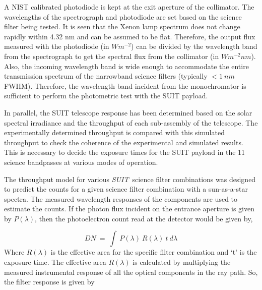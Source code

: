\documentclass[12pt]{spieman}  %
\newcommand{\suit}{{\it SUIT~}}
\begin{document}
	A NIST calibrated photodiode is kept at the exit aperture of the collimator. The wavelengths of the spectrograph and photodiode are set based on the science filter being tested. It is seen that the Xenon lamp spectrum does not change rapidly within 4.32 nm and can be assumed to be flat. Therefore, the output flux measured with the photodiode (in $Wm^{-2}$) can be divided by the wavelength band from the spectrograph to get the spectral flux from the collimator (in $W m^{-2} nm$). Also, the incoming wavelength band is wide enough to accommodate the entire transmission spectrum of the narrowband science filters (typically $< 1~nm$ FWHM). Therefore, the wavelength band incident from the monochromator is sufficient to perform the photometric test with the SUIT payload.
		
	In parallel, the SUIT telescope response has been determined based on the solar spectral irradiance and the throughput of each sub-assembly of the telescope. The experimentally determined throughput is compared with this simulated throughput to check the coherence of the experimental and simulated results. This is necessary to decide the exposure times for the SUIT payload in the 11 science bandpasses at various modes of operation.

 The throughput model for various \suit science filter combinations was designed to predict the counts for a given science filter combination with a sun-as-a-star spectra. The measured wavelength responses of the components are used to estimate the counts. If the photon flux incident on the entrance aperture is given by $P(\lambda)$, then the photoelectron count read at the detector would be given by,

 \begin{equation}\label{eq1}
     DN~=~\int~P(\lambda)~R(\lambda)~t~d\lambda
 \end{equation}
Where $R(\lambda)$ is the effective area for the specific filter combination and ‘t’ is the exposure time. The effective area $R(\lambda)$ is calculated by multiplying the measured instrumental response of all the optical components in the ray path. So, the filter response is given by
\end{document}
